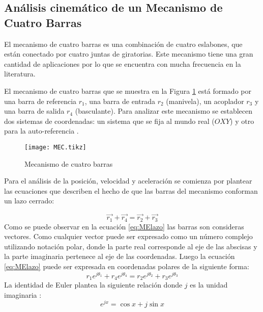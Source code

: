\subsection{Análisis cinemático de un Mecanismo de Cuatro Barras}\label{sec:Análisis cinemático de un Mecanismo de Cuatro Barras}
El mecanismo de cuatro barras es una combinación de cuatro eslabones, que están conectado por cuatro juntas de giratorias. Este mecanismo tiene una gran cantidad de aplicaciones por lo que se encuentra con mucha frecuencia en la literatura. 


El mecanismo de cuatro barras que se muestra en la Figura \ref{fig:MEC} está formado por una barra de referencia $r_1$, una barra de entrada $r_2$ (manivela), un acoplador $r_3$ y una barra de salida $r_4$ (basculante). Para analizar este mecanismo se establecen dos sistemas de coordenadas: un sistema que se fija al mundo real ($OXY$) y otro para la auto-referencia \cite{herne1_two_swim_2016}.

\begin{figure}[htb]
    \centering
    \resizebox {\textwidth} {\height} {
     \texttt{[image: MEC.tikz]}
     }
    \caption{Mecanismo de cuatro barras}
    \label{fig:MEC}
\end{figure}
Para el análisis de la posición, velocidad y aceleración se comienza por plantear las ecuaciones que describen el hecho de que las barras del mecanismo conforman un lazo cerrado:

\begin{equation}\label{eq:MElazo}
\vec{r_1}+\vec{r_4}=\vec{r_2}+\vec{r_3}
\end{equation}
Como se puede observar en la ecuación \ref{eq:MElazo} las barras son consideras vectores. Como cualquier vector puede ser expresado como un número complejo utilizando notación polar, donde la parte real corresponde al eje de las abscisas y la parte imaginaria pertenece al eje de las coordenadas. Luego la ecuación \ref{eq:MElazo} puede ser expresada en coordenadas polares de la siguiente forma:
\begin{equation}\label{eq:MElazoPolar}
r_1e^{j\theta_1}+r_4e^{j\theta_4}=r_2e^{j\theta_2}+r_3e^{j\theta_3}
\end{equation}
La identidad de Euler plantea la siguiente relación donde $j$ es la unidad imaginaria \cite{weisstein_euler_nodate}:
\begin{equation}\label{eq:Euler}
 e^{jx}=\cos{x}+j\sin{x} 
\end{equation}


